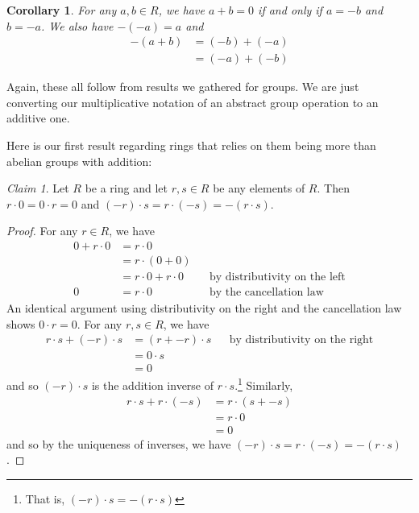 \documentclass[12pt,letterpaper,DIV=11,final]{scrartcl}
\theoremstyle{plain}
\newtheorem{corollary}{Corollary}
\theoremstyle{definition}
\theoremstyle{remark}
\newtheorem{claim}{Claim}
\begin{document}
\begin{corollary}\label{cor:ring_inverses}
  For any $a, b \in R$, we have $a + b = 0$ if and only if $a = -b$ and $b = -a$.
  We also have $- (-a) = a$ and
  \begin{align*}
    -(a + b) &= (-b) + (-a) \\
             &= (-a) + (-b)
  \end{align*}
\end{corollary}

Again, these all follow from results we gathered for groups.
We are just converting our multiplicative notation of an abstract group operation to an additive one.

Here is our first result regarding rings that relies on them being more than abelian groups with addition:

\begin{claim}
  Let $R$ be a ring and let $r, s \in R$ be any elements of $R$.
  Then $r \cdot 0 = 0 \cdot r = 0$ and $(-r) \cdot s = r \cdot (-s) = - (r \cdot s)$.

  \begin{proof}
    For any $r \in R$, we have
    \begin{align*}
      0 + r \cdot 0 &= r \cdot 0 \\
                    &= r \cdot (0 + 0) \\
                    &= r \cdot 0 + r \cdot 0 && \text{by distributivity on the left} \\
      0             &= r \cdot 0             && \text{by the cancellation law}
    \end{align*}
    An identical argument using distributivity on the right and the cancellation law shows $0 \cdot r = 0$.
    For any $r, s \in R$, we have
    \begin{align*}
      r \cdot s + (-r) \cdot s &= (r + -r) \cdot s && \text{by distributivity on the right} \\
                               &= 0 \cdot s \\
                               &= 0
    \end{align*}
    and so $(-r) \cdot s$ is the addition inverse of $r \cdot s$.\footnote{That is, $(-r) \cdot s = -(r \cdot s)$}
    Similarly,
    \begin{align*}
      r \cdot s + r \cdot (-s) &= r \cdot (s + -s) \\
                               &= r \cdot 0 \\
                               &= 0
    \end{align*}
    and so by the uniqueness of inverses, we have $(-r) \cdot s = r \cdot (-s) = -(r \cdot s)$.
  \end{proof}
\end{claim}
\end{document}
